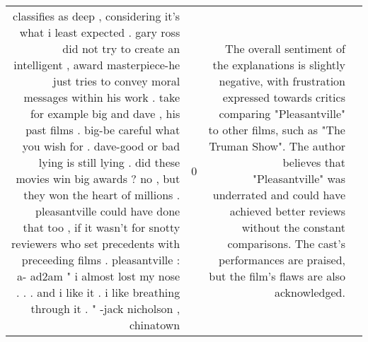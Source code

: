\begin{tabular}{r{1cm} p{0.4in} r{1cm} p{0.4in}}
classifies as deep , considering it's what i least expected .  gary ross did not try to create an intelligent , award masterpiece-he just tries to convey moral messages within his work .  take for example big and dave , his past films .  big-be careful what you wish for .  dave-good or bad lying is still lying .  did these movies win big awards ?  no , but they won the heart of millions .  pleasantville could have done that too , if it wasn't for snotty reviewers who set precedents with preceeding films .  pleasantville : a- ad2am " i almost lost my nose . . . and  i like it .  i like breathing through it . "  -jack nicholson , chinatown   & 0 & The overall sentiment of the explanations is slightly negative, with frustration expressed towards critics comparing "Pleasantville" to other films, such as "The Truman Show". The author believes that "Pleasantville" was underrated and could have achieved better reviews without the constant comparisons. The cast's performances are praised, but the film's flaws are also acknowledged. \\

\end{tabular}
